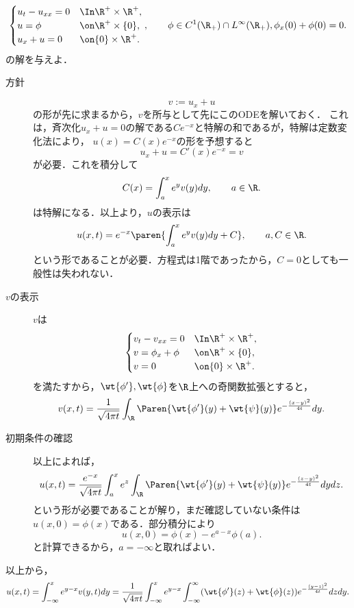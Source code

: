 \documentclass[uplatex,dvipdfmx]{jsreport}
\begin{document}
\begin{problem}
    \[\begin{cases}
        u_t-u_{xx}=0&\In\R^+\times\R^+,\\
        u=\phi&\on\R^+\times\{0\},\\
        u_x+u=0&\on\{0\}\times\R^+.
    \end{cases},\qquad\phi\in C^1(\R_+)\cap L^\infty(\R_+),\phi_x(0)+\phi(0)=0.\]
    の解を与えよ．
\end{problem}
\begin{Proof}[\underline{\bf【解】}]\mbox{}
    \begin{description}
        \item[方針] \[v:=u_x+u\]
        の形が先に求まるから，$v$を所与として先にこのODEを解いておく．
        これは，斉次化$u_x+u=0$の解である$Ce^{-x}$と特解の和であるが，特解は定数変化法により，
        $u(x)=C(x)e^{-x}$の形を予想すると
        \[u_x+u=C'(x)e^{-x}=v\]
        が必要．これを積分して
        \[C(x)=\int^x_ae^{y}v(y)dy,\qquad a\in\R.\]
        は特解になる．以上より，$u$の表示は
        \[u(x,t)=e^{-x}\paren{\int^x_ae^{y}v(y)dy+C},\qquad a,C\in\R.\]
        という形であることが必要．方程式は1階であったから，$C=0$としても一般性は失われない．
        \item[$v$の表示] $v$は
        \[\begin{cases}
            v_t-v_{xx}=0&\In\R^+\times\R^+,\\
            v=\phi_x+\phi&\on\R^+\times\{0\},\\
            v=0&\on\{0\}\times\R^+.
        \end{cases}\]
        を満たすから，$\wt{\phi'},\wt{\phi}$を$\R$上への奇関数拡張とすると，
        \[v(x,t)=\frac{1}{\sqrt{4\pi t}}\int_\R\Paren{\wt{\phi'}(y)+\wt{\psi}(y)}e^{-\frac{(x-y)^2}{4t}}dy.\]
        \item[初期条件の確認] 以上によれば，
        \[u(x,t)=\frac{e^{-x}}{\sqrt{4\pi t}}\int^x_ae^z\int_\R \Paren{\wt{\phi'}(y)+\wt{\psi}(y)}e^{-\frac{(z-y)^2}{4t}}dydz.\]
        という形が必要であることが解り，まだ確認していない条件は$u(x,0)=\phi(x)$である．部分積分により
        \[u(x,0)=\phi(x)-e^{a-x}\phi(a).\]
        と計算できるから，$a=-\infty$と取ればよい．
    \end{description}
    以上から，
    \[u(x,t)=\int^x_{-\infty}e^{y-x}v(y,t)dy=\frac{1}{\sqrt{4\pi t}}\int^x_{-\infty}e^{y-x}\int^\infty_{-\infty}(\wt{\phi'}(z)+\wt{\phi}(z))e^{-\frac{(y-z)^2}{4t}}dzdy.\]
\end{Proof}
\end{document}
